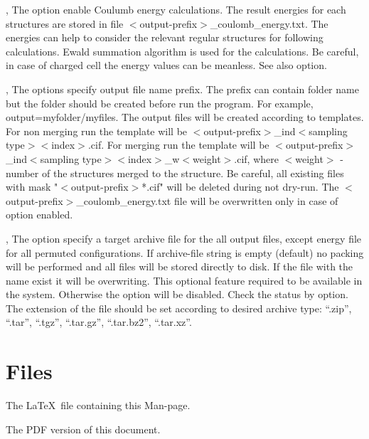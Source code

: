 \documentclass[a4paper,english]{article}
\begin{document}
\begin{Description}
\item[\Opt{-q}, \Opt{\Dd coulomb-energy}] 
      The option enable Coulumb energy calculations. The result energies for each structures are stored in file $<$output-prefix$>$\_coulomb\_energy.txt. The energies can help to consider the relevant regular structures for following calculations. Ewald summation algorithm is used for the calculations. Be careful, in case of charged cell the energy values can be meanless. See also  option.
      
\item[\OptArg{-o }{output-prefix}, \OptArg{\Dd output=}{output-prefix}]
      The options specify output file name prefix. The prefix can contain folder name but the folder should be created before run the program. For example, \Dd output=myfolder/myfiles. The output files will be created according to templates. For non merging run the template will be $<$output-prefix$>$\_ind$<$sampling type$><$index$>$.cif. For merging run the template will be $<$output-prefix$>$\_ind$<$sampling type$><$index$>$\_w$<$weight$>$.cif, where $<$weight$>$ - number of the structures merged to the structure. Be careful, all existing files with mask "$<$output-prefix$>$*.cif" will be deleted during not dry-run. The $<$output-prefix$>$\_coulomb\_energy.txt file will be overwritten only in case of  option enabled.
      
\item[\OptArg{-a }{archive-file}, \OptArg{\Dd archive=}{archive-file}]
      The option specify a target archive file for the all output files, except energy file for all permuted configurations. If archive-file string is empty (default) no packing will be performed and all files will be stored directly to disk. If the file with the name exist it will be overwriting. This optional feature required  to be available in the system. Otherwise the option will be disabled. Check the status by  option. The extension of the file should be set according to desired archive type: ``.zip'', ``.tar'', ``.tgz'', ``.tar.gz'', ``.tar.bz2'', ``.tar.xz''.

\end{Description}

\section{Files}

\begin{Description}\setlength{\itemsep}{0cm}
\item[\File{somthing}] The \LaTeX\ file containing this Man-page.
\item[\URL{1.pdf}] The PDF version of this document.
\end{Description}
\end{document}

